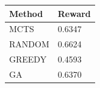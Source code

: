 \begin{tabular}{ll}
\hline
Method & Reward \\
\hline
  MCTS & 0.6347 \\
  RANDOM & 0.6624 \\
  GREEDY & 0.4593 \\
  GA & 0.6370 \\
\hline
\end{tabular}
